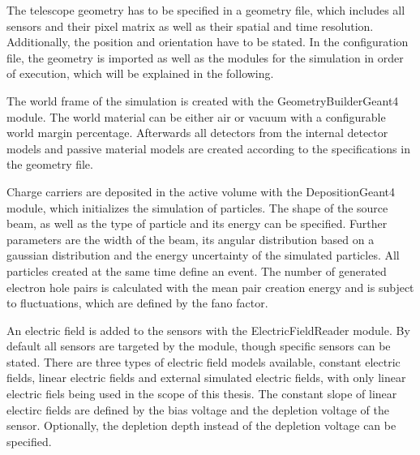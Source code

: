 The telescope geometry has to be specified in a geometry file, which includes all sensors and their pixel matrix as well as their spatial and time resolution. Additionally,
the position and orientation have to be stated. In the configuration file, the geometry is imported as well as the modules for the simulation in order of execution, which
will be explained in the following.

The world frame of the simulation is created with the GeometryBuilderGeant4 module. The world material can be either air or vacuum with a configurable world margin percentage.
Afterwards all detectors from the internal detector models and passive material models are created according to the specifications in the geometry file.

Charge carriers are deposited in the active volume with the DepositionGeant4 module, which initializes the simulation of particles. The shape of the source beam, as well
as the type of particle and its energy can be specified. Further parameters are the width of the beam, its angular distribution based on a gaussian distribution and the energy
uncertainty of the simulated particles. All particles created at the same time define an event. The number of generated electron hole pairs is calculated with the
mean pair creation energy and is subject to fluctuations, which are defined by the fano factor.

An electric field is added to the sensors with the ElectricFieldReader module. By default all sensors are targeted by the module, though specific sensors can be stated.
There are three types of electric field models available, constant electric fields, linear electric fields and external simulated electric fields, with only
linear electric fiels being used in the scope of this thesis. The constant slope of linear electirc fields are defined by the bias voltage and the
depletion voltage of the sensor. Optionally, the depletion depth instead of the depletion voltage can be specified.

